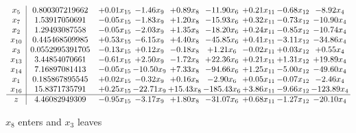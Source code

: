 \documentclass[9pt]{article}
\begin{document}
 \[\begin{array}{c| c c@{\hskip 2pt} c@{\hskip 2pt} c@{\hskip 2pt} c@{\hskip 2pt} c@{\hskip 2pt} c@{\hskip 2pt} c@{\hskip 2pt} }
 x_{5}   &  0.800307219662 & +  0.01 x_{15} & -1.46 x_{9} & +  0.89 x_{8} & -11.90 x_{6} & +  0.21 x_{11} & -0.68 x_{12} & -8.92 x_{4}\\
 x_{7}   &  1.53917050691 & -0.05 x_{15} & -1.83 x_{9} & +  1.20 x_{8} & -15.93 x_{6} & +  0.32 x_{11} & -0.73 x_{12} & -10.90 x_{4}\\
 x_{2}   &  1.29493087558 & -0.05 x_{15} & -2.03 x_{9} & +  1.35 x_{8} & -18.20 x_{6} & +  0.24 x_{11} & -0.85 x_{12} & -10.74 x_{4}\\
 x_{10}   &  0.445468509985 & +  0.53 x_{15} & -6.15 x_{9} & +  4.40 x_{8} & -45.85 x_{6} & +  0.41 x_{11} & -3.11 x_{12} & -34.86 x_{4}\\
 x_{3}   &  0.0552995391705 & -0.13 x_{15} & +  0.12 x_{9} & -0.18 x_{8} & +  1.21 x_{6} & -0.02 x_{11} & +  0.03 x_{12} & +  0.55 x_{4}\\
 x_{13}   &  3.44854070661 & -0.61 x_{15} & +  2.50 x_{9} & -1.72 x_{8} & + 22.36 x_{6} & +  0.21 x_{11} & +  1.31 x_{12} & + 19.89 x_{4}\\
 x_{14}   &  7.16897081413 & -0.05 x_{15} & -10.50 x_{9} & +  7.33 x_{8} & -94.66 x_{6} & +  1.25 x_{11} & -5.00 x_{12} & -49.60 x_{4}\\
 x_{1}   &  0.185867895545 & +  0.02 x_{15} & -0.32 x_{9} & +  0.16 x_{8} & -2.90 x_{6} & +  0.05 x_{11} & -0.07 x_{12} & -2.46 x_{4}\\
 x_{16}   &  15.8371735791 & +  0.25 x_{15} & -22.71 x_{9} & + 15.43 x_{8} & -185.43 x_{6} & +  3.86 x_{11} & -9.66 x_{12} & -123.89 x_{4}\\
\hline
z    &  4.46082949309 & -0.95 x_{15} & -3.17 x_{9} & +  1.80 x_{8} & -31.07 x_{6} & +  0.68 x_{11} & -1.27 x_{12} & -20.10 x_{4}\\
\end{array}\]


 $ x_{8} $ enters and $ x_{3} $ leaves 
\end{document}
